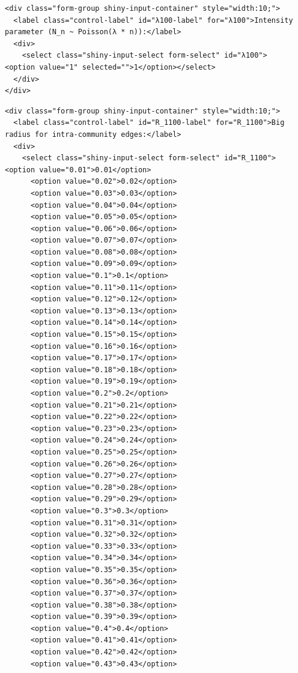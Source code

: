 \documentclass[
  letterpaper,
  DIV=11,
  numbers=noendperiod]{scrartcl}
\begin{document}
\label{input_selects_100-5}
\begin{verbatim}
<div class="form-group shiny-input-container" style="width:10;">
  <label class="control-label" id="λ100-label" for="λ100">Intensity parameter (N_n ~ Poisson(λ * n)):</label>
  <div>
    <select class="shiny-input-select form-select" id="λ100">      <option value="1" selected="">1</option></select>
  </div>
</div>
\end{verbatim}

\label{input_selects_100-6}
\begin{verbatim}
<div class="form-group shiny-input-container" style="width:10;">
  <label class="control-label" id="R_1100-label" for="R_1100">Big radius for intra-community edges:</label>
  <div>
    <select class="shiny-input-select form-select" id="R_1100">      <option value="0.01">0.01</option>
      <option value="0.02">0.02</option>
      <option value="0.03">0.03</option>
      <option value="0.04">0.04</option>
      <option value="0.05">0.05</option>
      <option value="0.06">0.06</option>
      <option value="0.07">0.07</option>
      <option value="0.08">0.08</option>
      <option value="0.09">0.09</option>
      <option value="0.1">0.1</option>
      <option value="0.11">0.11</option>
      <option value="0.12">0.12</option>
      <option value="0.13">0.13</option>
      <option value="0.14">0.14</option>
      <option value="0.15">0.15</option>
      <option value="0.16">0.16</option>
      <option value="0.17">0.17</option>
      <option value="0.18">0.18</option>
      <option value="0.19">0.19</option>
      <option value="0.2">0.2</option>
      <option value="0.21">0.21</option>
      <option value="0.22">0.22</option>
      <option value="0.23">0.23</option>
      <option value="0.24">0.24</option>
      <option value="0.25">0.25</option>
      <option value="0.26">0.26</option>
      <option value="0.27">0.27</option>
      <option value="0.28">0.28</option>
      <option value="0.29">0.29</option>
      <option value="0.3">0.3</option>
      <option value="0.31">0.31</option>
      <option value="0.32">0.32</option>
      <option value="0.33">0.33</option>
      <option value="0.34">0.34</option>
      <option value="0.35">0.35</option>
      <option value="0.36">0.36</option>
      <option value="0.37">0.37</option>
      <option value="0.38">0.38</option>
      <option value="0.39">0.39</option>
      <option value="0.4">0.4</option>
      <option value="0.41">0.41</option>
      <option value="0.42">0.42</option>
      <option value="0.43">0.43</option>

\end{verbatim}
\end{document}
